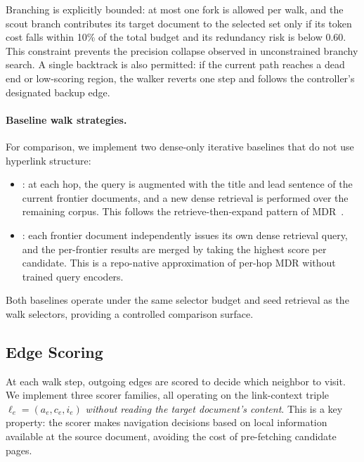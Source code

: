 Branching is explicitly bounded: at most one fork is allowed per walk, and the scout branch contributes its target document to the selected set only if its token cost falls within 10\% of the total budget and its redundancy risk is below 0.60. This constraint prevents the precision collapse observed in unconstrained branchy search. A single backtrack is also permitted: if the current path reaches a dead end or low-scoring region, the walker reverts one step and follows the controller's designated backup edge.

\paragraph{Baseline walk strategies.}
For comparison, we implement two dense-only iterative baselines that do not use hyperlink structure:

\begin{itemize}[leftmargin=*,nosep]
\item \seliterdense{}: at each hop, the query is augmented with the title and lead sentence of the current frontier documents, and a new dense retrieval is performed over the remaining corpus. This follows the retrieve-then-expand pattern of MDR~\cite{xiong2021mdr}.
\item \selmdrlight{}: each frontier document independently issues its own dense retrieval query, and the per-frontier results are merged by taking the highest score per candidate. This is a repo-native approximation of per-hop MDR without trained query encoders.
\end{itemize}

Both baselines operate under the same selector budget and seed retrieval as the walk selectors, providing a controlled comparison surface.

\subsection{Edge Scoring}
\label{sec:method:scoring}

At each walk step, outgoing edges are scored to decide which neighbor to visit. We implement three scorer families, all operating on the link-context triple $\ell_e = (a_e, c_e, i_e)$ \emph{without reading the target document's content}. This is a key property: the scorer makes navigation decisions based on local information available at the source document, avoiding the cost of pre-fetching candidate pages.


